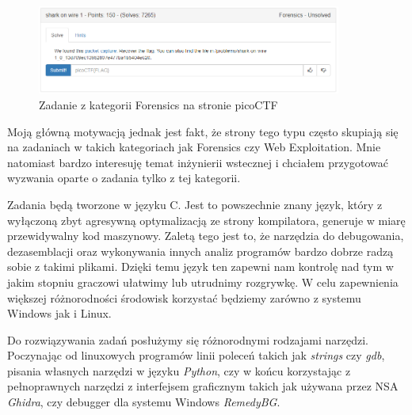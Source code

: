 \documentclass[polish,12pt]{aghthesis}
\begin{document}
\begin{figure}[h]
    \centering
    \includegraphics[width=10cm]{picoctf}
    \caption{Zadanie z kategorii Forensics na stronie picoCTF}
    \label{fig:picoctf}
\end{figure}

Moją główną motywacją jednak jest fakt, że strony tego typu często skupiają
się na zadaniach w takich kategoriach jak Forensics czy Web Exploitation.
Mnie natomiast bardzo interesuję temat inżynierii wstecznej i chciałem
przygotować wyzwania oparte o zadania tylko z tej kategorii.

Zadania będą tworzone w języku C. Jest to powszechnie znany język, który
z wyłączoną zbyt agresywną optymalizacją ze strony kompilatora, generuje
w miarę przewidywalny kod maszynowy. Zaletą tego jest to, że narzędzia
do debugowania, dezasemblacji oraz wykonywania innych analiz programów
bardzo dobrze radzą sobie z takimi plikami. Dzięki temu język ten
zapewni nam kontrolę nad tym w jakim stopniu graczowi ułatwimy
lub utrudnimy rozgrywkę. W celu zapewnienia większej różnorodności
środowisk korzystać będziemy zarówno z systemu Windows jak i Linux.

Do rozwiązywania zadań posłużymy się różnorodnymi rodzajami narzędzi.
Poczynając od linuxowych programów linii poleceń takich jak \emph{strings}
czy \emph{gdb}, pisania własnych narzędzi w języku \emph{Python},
czy w końcu korzystając z pełnoprawnych narzędzi z interfejsem graficznym takich
jak używana przez NSA \emph{Ghidra}, czy debugger dla systemu
Windows \emph{RemedyBG}.

\clearpage


\section{\SectionTitleScope}
\label{sec:zakres-funkcjonalnosci}
\end{document}
